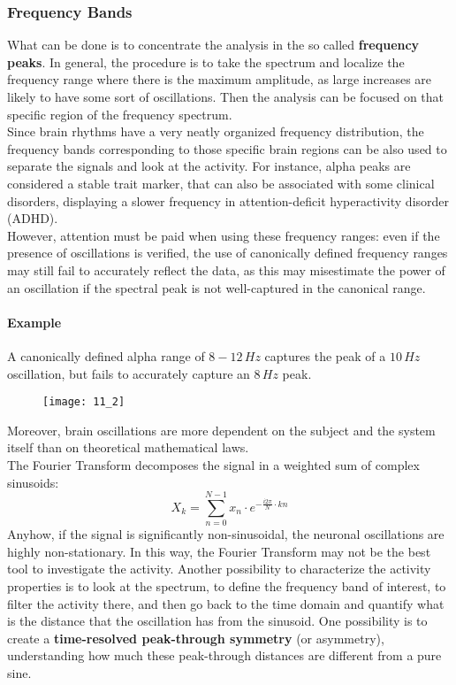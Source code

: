 \subsubsection{Frequency Bands}
What can be done is to concentrate the analysis in the so called \textbf{frequency peaks}.
In general, the procedure is to take the spectrum and localize the frequency range where
there is the maximum amplitude, as large increases are likely to have some sort of oscillations.
Then the analysis can be focused on that specific region of the frequency spectrum.\\
Since brain rhythms have a very neatly organized frequency distribution, the frequency
bands corresponding to those specific brain regions can be also used to separate the signals
and look at the activity. For instance, alpha peaks are considered a stable trait marker,
that can also be associated with some clinical disorders, displaying a slower frequency in
attention-deficit hyperactivity disorder (ADHD).\\
However, attention must be paid when using these frequency ranges: even if the presence of
oscillations is verified, the use of canonically defined frequency ranges may still fail
to accurately reflect the data, as this may misestimate the power of an oscillation if the
spectral peak is not well-captured in the canonical range.
\paragraph{Example} A canonically defined alpha range of \(8-12\,Hz\) captures the peak of
a \(10\,Hz\) oscillation, but fails to accurately capture an \(8\,Hz\) peak.
\begin{figure}[H]
    \texttt{[image: 11\_2]}
    \centering
\end{figure}
Moreover, brain oscillations are more dependent on the subject and the system itself than
on theoretical mathematical laws.\\
The Fourier Transform decomposes the signal in a weighted sum of complex sinusoids:
\begin{equation*}
    X_k=\sum_{n=0}^{N-1} x_n\cdot e^{-\frac{i2\pi}{N}\cdot kn}
\end{equation*}
Anyhow, if the signal is significantly non-sinusoidal, the neuronal oscillations are highly
non-stationary. In this way, the Fourier Transform may not be the best tool to investigate
the activity. Another possibility to characterize the activity properties is to look at the
spectrum, to define the frequency band of interest, to filter the activity there, and then go
back to the time domain and quantify what is the distance that the oscillation has from the
sinusoid. One possibility is to create a \textbf{time-resolved peak-through symmetry}
(or asymmetry), understanding how much these peak-through distances are different from a pure sine.

